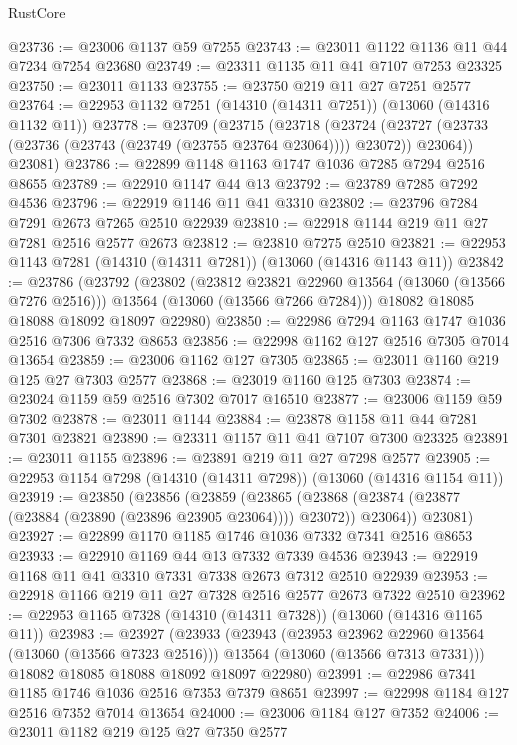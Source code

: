 \begin{lexlean}{RustCore}
\begin{coremodule}
@23736 := @23006 @1137 @59 @7255
@23743 := @23011 @1122 @1136 @11 @44 @7234 @7254 @23680
@23749 := @23311 @1135 @11 @41 @7107 @7253 @23325
@23750 := @23011 @1133
@23755 := @23750 @219 @11 @27 @7251 @2577
@23764 := @22953 @1132 @7251 (@14310 (@14311 @7251)) (@13060 (@14316 @1132 @11))
@23778 := @23709
    (@23715
      (@23718
        (@23724 (@23727 (@23733 (@23736 (@23743 (@23749 (@23755 @23764 @23064)))) @23072)) @23064))
      @23081)
@23786 := @22899 @1148 @1163 @1747 @1036 @7285 @7294 @2516 @8655
@23789 := @22910 @1147 @44 @13
@23792 := @23789 @7285 @7292 @4536
@23796 := @22919 @1146 @11 @41 @3310
@23802 := @23796 @7284 @7291 @2673 @7265 @2510 @22939
@23810 := @22918 @1144 @219 @11 @27 @7281 @2516 @2577 @2673
@23812 := @23810 @7275 @2510
@23821 := @22953 @1143 @7281 (@14310 (@14311 @7281)) (@13060 (@14316 @1143 @11))
@23842 := @23786
    (@23792
      (@23802
        (@23812 @23821 @22960 @13564 (@13060 (@13566 @7276 @2516)))
        @13564
        (@13060 (@13566 @7266 @7284)))
      @18082
      @18085
      @18088
      @18092
      @18097
      @22980)
@23850 := @22986 @7294 @1163 @1747 @1036 @2516 @7306 @7332 @8653
@23856 := @22998 @1162 @127 @2516 @7305 @7014 @13654
@23859 := @23006 @1162 @127 @7305
@23865 := @23011 @1160 @219 @125 @27 @7303 @2577
@23868 := @23019 @1160 @125 @7303
@23874 := @23024 @1159 @59 @2516 @7302 @7017 @16510
@23877 := @23006 @1159 @59 @7302
@23878 := @23011 @1144
@23884 := @23878 @1158 @11 @44 @7281 @7301 @23821
@23890 := @23311 @1157 @11 @41 @7107 @7300 @23325
@23891 := @23011 @1155
@23896 := @23891 @219 @11 @27 @7298 @2577
@23905 := @22953 @1154 @7298 (@14310 (@14311 @7298)) (@13060 (@14316 @1154 @11))
@23919 := @23850
    (@23856
      (@23859
        (@23865 (@23868 (@23874 (@23877 (@23884 (@23890 (@23896 @23905 @23064)))) @23072)) @23064))
      @23081)
@23927 := @22899 @1170 @1185 @1746 @1036 @7332 @7341 @2516 @8653
@23933 := @22910 @1169 @44 @13 @7332 @7339 @4536
@23943 := @22919 @1168 @11 @41 @3310 @7331 @7338 @2673 @7312 @2510 @22939
@23953 := @22918 @1166 @219 @11 @27 @7328 @2516 @2577 @2673 @7322 @2510
@23962 := @22953 @1165 @7328 (@14310 (@14311 @7328)) (@13060 (@14316 @1165 @11))
@23983 := @23927
    (@23933
      (@23943
        (@23953 @23962 @22960 @13564 (@13060 (@13566 @7323 @2516)))
        @13564
        (@13060 (@13566 @7313 @7331)))
      @18082
      @18085
      @18088
      @18092
      @18097
      @22980)
@23991 := @22986 @7341 @1185 @1746 @1036 @2516 @7353 @7379 @8651
@23997 := @22998 @1184 @127 @2516 @7352 @7014 @13654
@24000 := @23006 @1184 @127 @7352
@24006 := @23011 @1182 @219 @125 @27 @7350 @2577

\end{coremodule}
\end{lexlean}
